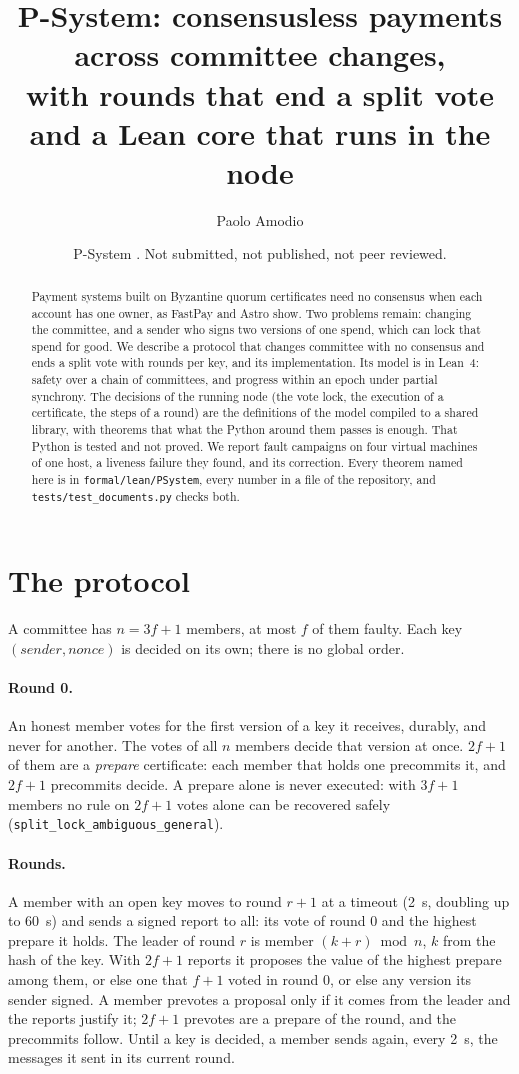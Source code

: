 \documentclass[10pt,a4paper]{article}
\title{P-System: consensusless payments across committee changes,\\
with rounds that end a split vote and a Lean core that runs in the node}
\author{Paolo Amodio}
\date{P-System \code{1.0.0}. Not submitted, not published, not peer reviewed.}
\newcommand{\code}[1]{\texttt{#1}}
\begin{document}
\maketitle

\begin{abstract}
Payment systems built on Byzantine quorum certificates need no consensus when each account has one
owner, as FastPay and Astro show. Two problems remain: changing the committee, and a sender who signs
two versions of one spend, which can lock that spend for good. We describe a protocol that changes
committee with no consensus and ends a split vote with rounds per key, and its implementation. Its
model is in Lean~4: safety over a chain of committees, and progress within an epoch under partial
synchrony. The decisions of the running node (the vote lock, the execution of a certificate, the steps of
a round) are the definitions of the model compiled to a shared library, with theorems that what the
Python around them passes is enough. That Python is tested and not proved. We report fault campaigns on
four virtual machines of one host, a liveness failure they found, and its correction.
Every theorem named here is in \code{formal/lean/PSystem}, every number in a file of the repository,
and \code{tests/test\_documents.py} checks both.
\end{abstract}

\section{The protocol}

A committee has $n = 3f+1$ members, at most $f$ of them faulty. Each key $(\mathit{sender},
\mathit{nonce})$ is decided on its own; there is no global order.

\paragraph{Round 0.} An honest member votes for the first version of a key it receives, durably, and
never for another. The votes of all $n$ members decide that version at once. $2f+1$ of them are a
\emph{prepare} certificate: each member that holds one precommits it, and $2f+1$ precommits decide.
A prepare alone is never executed: with $3f+1$ members no rule on $2f+1$ votes alone can be recovered
safely (\code{split\_lock\_ambiguous\_general}).

\paragraph{Rounds.} A member with an open key moves to round $r+1$ at a timeout (2~s, doubling up to
60~s) and sends a signed report to all: its vote of round 0 and the highest prepare it holds. The leader
of round $r$ is member $(k + r) \bmod n$, $k$ from the hash of the key. With $2f+1$ reports it proposes
the value of the highest prepare among them, or else one that $f+1$ voted in round 0, or else any version
its sender signed. A member prevotes a proposal only if it comes from the leader and the reports justify
it; $2f+1$ prevotes are a prepare of the round, and the precommits follow. Until a key is decided, a
member sends again, every 2~s, the messages it sent in its current round.
\end{document}
